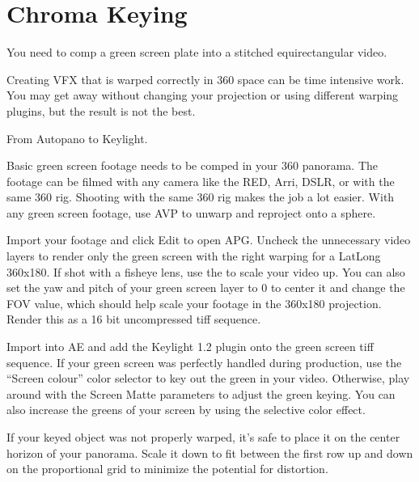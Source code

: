 \chapter{Chroma Keying}
\pagecolor{white}
\label{chap:53}
\begin{fullwidth}

\problem

{\large You need to comp a green screen plate into a stitched equirectangular video. \par}

Creating VFX that is warped correctly in 360 space can be time intensive work. You may get away without changing your projection or using different warping plugins, but the result is not the best. 

\solution

{\large From Autopano to Keylight. \par}

Basic green screen footage needs to be comped in your 360 panorama. The footage can be filmed with any camera like the RED, Arri, DSLR, or with the same 360 rig. Shooting with the same 360 rig makes the job a lot easier. With any green screen footage, use AVP to unwarp and reproject onto a sphere. 


Import your footage and click Edit to open APG. Uncheck the unnecessary video layers to render only the green screen with the right warping for a LatLong 360x180. If shot with a fisheye lens, use the \textbf{} to scale your video up. You can also set the yaw and pitch of your green screen layer to 0 to center it and change the FOV value, which should help scale your footage in the 360x180 projection. Render this as a 16 bit uncompressed tiff sequence.


Import into AE and add the Keylight 1.2 plugin onto the green screen tiff sequence. If your green screen was perfectly handled during production, use the “Screen colour” color selector to key out the green in your video. Otherwise, play around with the Screen Matte parameters to adjust the green keying. You can also increase the greens of your screen by using the selective color effect.

\clearpage
If your keyed object was not properly warped, it's safe to place it on the center horizon of your panorama. Scale it down to fit between the first row up and down on the proportional grid to minimize the potential for distortion.


\end{fullwidth}
